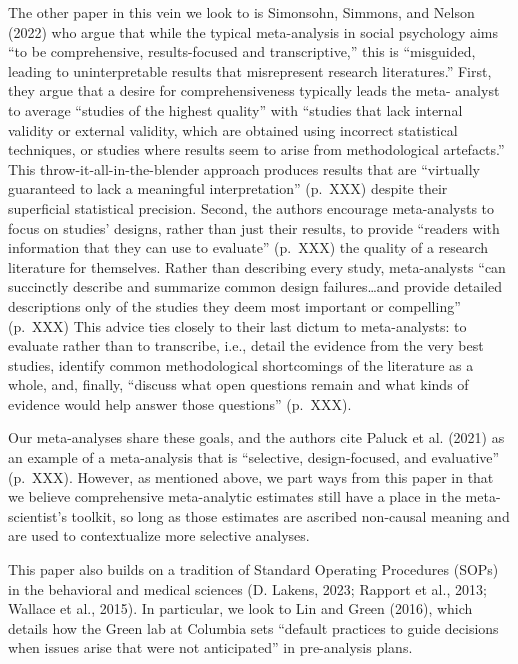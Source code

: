 \documentclass[
  ,jou]{apa6}
\begin{document}
The other paper in this vein we look to is Simonsohn, Simmons, and Nelson (2022) who argue that while the typical meta-analysis in social psychology aims ``to be comprehensive, results-focused and transcriptive,'' this is ``misguided, leading to uninterpretable results that misrepresent research literatures.'' First, they argue that a desire for comprehensiveness typically leads the meta- analyst to average ``studies of the highest quality'' with ``studies that lack internal validity or external validity, which are obtained using incorrect statistical techniques, or studies where results seem to arise from methodological artefacts.'' This throw-it-all-in-the-blender approach produces results that are ``virtually guaranteed to lack a meaningful interpretation'' (p.~XXX) despite their superficial statistical precision. Second, the authors encourage meta-analysts to focus on studies' designs, rather than just their results, to provide ``readers with information that they can use to evaluate'' (p.~XXX) the quality of a research literature for themselves. Rather than describing every study, meta-analysts ``can succinctly describe and summarize common design failures\ldots and provide detailed descriptions only of the studies they deem most important or compelling'' (p.~XXX) This advice ties closely to their last dictum to meta-analysts: to evaluate rather than to transcribe, i.e., detail the evidence from the very best studies, identify common methodological shortcomings of the literature as a whole, and, finally, ``discuss what open questions remain and what kinds of evidence would help answer those questions'' (p.~XXX).

Our meta-analyses share these goals, and the authors cite Paluck et al. (2021) as an example of a meta-analysis that is ``selective, design-focused, and evaluative'' (p.~XXX). However, as mentioned above, we part ways from this paper in that we believe comprehensive meta-analytic estimates still have a place in the meta-scientist's toolkit, so long as those estimates are ascribed non-causal meaning and are used to contextualize more selective analyses.

This paper also builds on a tradition of Standard Operating Procedures (SOPs) in the behavioral and medical sciences (D. Lakens, 2023; Rapport et al., 2013; Wallace et al., 2015). In particular, we look to Lin and Green (2016), which details how the Green lab at Columbia sets ``default practices to guide decisions when issues arise that were not anticipated'' in pre-analysis plans.
\end{document}
